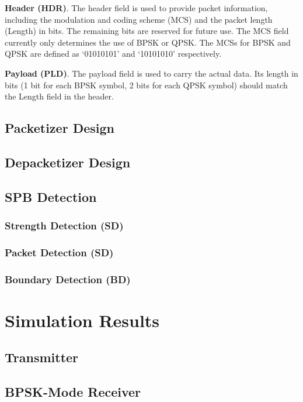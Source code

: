 \documentclass[journal,twoside]{IEEEtran}
\begin{document}
    \textbf{Header (HDR)}.
    The header field is used to provide packet information,
    including the modulation and coding scheme (MCS) and the packet length (Length) in bits.
    The remaining bits are reserved for future use.
    The MCS field currently only determines the use of BPSK or QPSK.
    The MCSs for BPSK and QPSK are defined as `01010101' and `10101010' respectively.

    \textbf{Payload (PLD)}.
    The payload field is used to carry the actual data.
    Its length in bits (1 bit for each BPSK symbol, 2 bits for each QPSK symbol) should match the Length field in the header.

    \subsection{Packetizer Design}

    \subsection{Depacketizer Design}

    \subsection{SPB Detection}

      \subsubsection{Strength Detection (SD)}

      \subsubsection{Packet Detection (SD)}

      \subsubsection{Boundary Detection (BD)}

  \section{Simulation Results}

    \subsection{Transmitter}

    \subsection{BPSK-Mode Receiver}
\end{document}
